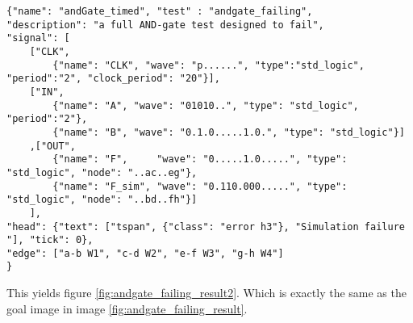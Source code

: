 \begin{lstlisting}[style=json, caption={Final content of the result file of a failing AND-gate example}, label={json:andgate_failing_result}]
{"name": "andGate_timed", "test" : "andgate_failing", 
"description": "a full AND-gate test designed to fail",
"signal": [
	["CLK",
		{"name": "CLK", "wave": "p......", "type":"std_logic", "period":"2", "clock_period": "20"}],
	["IN",
		{"name": "A", "wave": "01010..", "type": "std_logic", "period":"2"},
		{"name": "B", "wave": "0.1.0.....1.0.", "type": "std_logic"}]
	,["OUT",
		{"name": "F",     "wave": "0.....1.0.....", "type": "std_logic", "node": "..ac..eg"},
		{"name": "F_sim", "wave": "0.110.000.....", "type": "std_logic", "node": "..bd..fh"}]
	], 
"head": {"text": ["tspan", {"class": "error h3"}, "Simulation failure "], "tick": 0}, 
"edge": ["a-b W1", "c-d W2", "e-f W3", "g-h W4"]
}
\end{lstlisting}\noindent
This yields figure \ref{fig:andgate_failing_result2}.
\nline
Which is exactly the same as the goal image in image \ref{fig:andgate_failing_result}.\newpage

